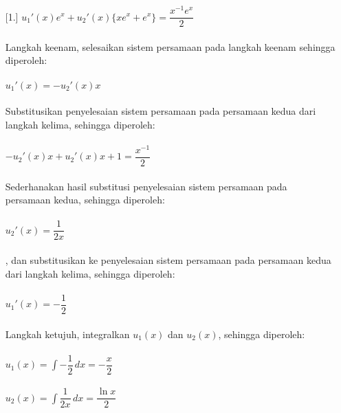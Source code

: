 \begin{enumerate} [1.]
	\begin{math} u_1 '(x) e^{x} + u_2 ' (x) \big\{ xe^{x} + e^{x} \big\} =  \dfrac{ x^{-1} e^{x}}{2} \end{math} \\ \\
	Langkah keenam, selesaikan sistem persamaan pada langkah keenam sehingga diperoleh: \\ \\
	\begin{math} u_1 ' (x) = -u_2 ' (x) x \end{math} \\ \\
	Substitusikan penyelesaian sistem persamaan pada persamaan kedua dari langkah kelima, sehingga diperoleh: \\ \\
	\begin{math} -u_2 ' (x) x + u_2 ' (x) x + 1 = \dfrac{x^{-1}}{2} \end{math} \\ \\
	Sederhanakan hasil substitusi penyelesaian sistem persamaan pada persamaan kedua, sehingga diperoleh: \\ \\
	\begin{math} u_2 ' (x) = \dfrac{1}{2x} \end{math} \\ \\
	, dan substitusikan ke  penyelesaian sistem persamaan pada persamaan kedua dari langkah kelima, sehingga diperoleh: \\ \\
	\begin{math} u_1 '(x) = -\dfrac{1}{2} \end{math} \\ \\
	Langkah ketujuh, integralkan \begin{math} u_1 (x) \end{math} dan \begin{math} u_2 (x) \end{math}, sehingga diperoleh: \\ \\
	\begin{math} u_1 (x) = \int -\dfrac{1}{2} \, dx = -\dfrac{x}{2} \end{math} \\ \\
	\begin{math} u_2 (x) = \int \dfrac{1}{2x} \, dx = \dfrac{\ln x}{2} \end{math} \\ \\

\end{enumerate}
